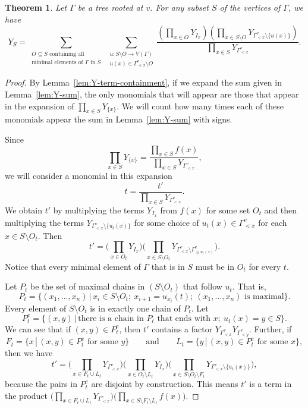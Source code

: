 \documentclass[pdftex]{sigma}
\numberwithin{equation}{section}
\newtheorem{Theorem}{Theorem}[section]
\begin{document}
\begin{Theorem}\label{thm:Y-formula}
Let $\Gamma$ be a tree rooted at $v$. For any subset $S$ of the vertices of $\Gamma$, we have
\[ Y_S=\sum_{\substack{O\subseteq S\text{ containing all}\\ \text{minimal elements of }\Gamma\text{ in }S}} \, \sum_{\substack{u\colon S\setminus O\to V(\Gamma)\\ u(x)\in\Gamma_{\lessdot x}^v\setminus O}}\frac{\left(\prod_{x\in O}Y_{I_x} \right)\left(\prod_{x\in S\setminus O}Y_{\Gamma_{< x}^v\setminus\{u(x)\}} \right)}{\prod_{x\in S}Y_{\Gamma_{< x}^v}}.\]
\end{Theorem}

\begin{proof}
By Lemma~\ref{lem:Y-term-containment}, if we expand the sum given in Lemma~\ref{lem:Y-sum}, the only monomials that will appear are those that appear in the expansion of $\prod_{x\in S}Y_{\{x\}}$. We will count how many times each of these monomials appear the sum in Lemma~\ref{lem:Y-sum} with signs.

Since
\[ \prod_{x\in S}Y_{\{x\}}=\frac{\prod_{x\in S}f(x)}{\prod_{x\in S}Y_{\Gamma_{< x}^v}},\]
we will consider a monomial in this expansion
\[ t=\frac{t'}{\prod_{x\in S}Y_{\Gamma_{< x}^v}}.\]
We obtain $t'$ by multiplying the terms $Y_{I_x}$ from $f(x)$ for some set $O_t$ and then multiplying the terms $Y_{\Gamma_{< x}^v\setminus\{u_t(x)\}}$ for some choice of $u_t(x)\in\Gamma_{\lessdot x}^v$ for each $x\in S\setminus O_t$. Then \[ t'=\bigg(\prod_{x\in O_t}Y_{I_x} \bigg)\bigg(\prod_{x\in S\setminus O_t}Y_{\Gamma_{< x}^v\setminus\Gamma_{\geq u_t(x)}^v} \bigg).\]
Notice that every minimal element of $\Gamma$ that is in $S$ must be in $O_t$ for every $t$.


Let $P_t$ be the set of maximal chains in $(S\setminus O_t)$ that follow $u_t$. That is,
\[ P_t=\{(x_1,\dots,x_n)\, |\, x_i\in S\setminus O_t;\ x_{i+1}=u_{x_i}(t);\ (x_1,\dots,x_n)\text{ is maximal}\}.\]
Every element of $S\setminus O_t$ is in exactly one chain of $P_t$. Let \[ P_t^e=\{(x,y)\, |\, \text{there is a chain in }P_t\text{ that ends with }x;\ u_t(x)=y\in S\}.\]
We can see that if $(x,y)\in P_t^e$, then $t'$ contains a factor $Y_{\Gamma_{< x}^v}Y_{\Gamma_{< y}^v}$. Further, if
\[
F_t=\{x\, |\, (x,y)\in P_t^e\text{ for some }y\} \qquad \text{and} \qquad L_t=\{y\, |\, (x,y)\in P_t^e\text{ for some }x\},
\] then we have
\[ t'=\bigg(\prod_{x\in F_t\cup L_t}Y_{\Gamma_{< x}^v}\bigg)\bigg(\prod_{x\in O_t\setminus L_t}Y_{I_x} \bigg)\bigg(\prod_{x\in S\setminus O_t\setminus F_t}Y_{\Gamma_{< x}^v\setminus\{u_t(x)\}} \bigg),\]
because the pairs in $P_t^e$ are disjoint by construction. This means $t'$ is a term in the product $\big(\prod_{x\in F_t\cup L_t}Y_{\Gamma_{< x}^v}\big)\big(\prod_{x\in S\setminus F_t\setminus L_t} f(x) \big)$.


\end{proof}
\end{document}
